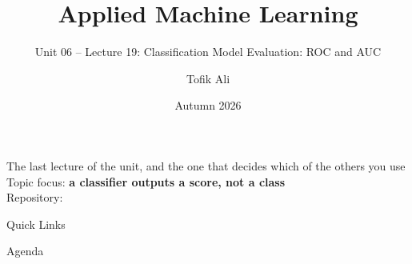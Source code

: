 \documentclass[aspectratio=169]{beamer}
\title[Applied Machine Learning]{Applied Machine Learning}
\subtitle{Unit 06 -- Lecture 19: Classification Model Evaluation:
          ROC and AUC}
\author{Tofik Ali}
\institute{School of Computer Science, UPES Dehradun}
\date{Autumn 2026}
\begin{document}
\UPESCoverFrame
\setcounter{framenumber}{0}

\begin{frame}
  \titlepage
  \begin{center}
    \footnotesize The last lecture of the unit, and the one that decides which
    of the others you use\\[0.25em]
    \footnotesize Topic focus: \textbf{a classifier outputs a score, not a
    class}\\[0.25em]
    \footnotesize Repository: \texttt{\AMLRepoURL}
  \end{center}
  \slidesources{\AMLUnitVISources}
\end{frame}

\begin{frame}{Quick Links}
  \centering
  \hyperlink{sec:whynot}{}\hspace{0.4em}
  \hyperlink{sec:cm}{}\hspace{0.4em}
  \hyperlink{sec:scores}{}\hspace{0.4em}
  \hyperlink{sec:rochand}{}\hspace{0.4em}
  \hyperlink{sec:auc}{}\hspace{0.4em}
  \hyperlink{sec:rocpr}{}\hspace{0.4em}
  \hyperlink{sec:threshold}{}\hspace{0.4em}
  \hyperlink{sec:multi}{}\hspace{0.4em}
  \hyperlink{sec:selection}{}\hspace{0.4em}
  \hyperlink{sec:summary}{}
\end{frame}

\begin{frame}{Agenda}
  \tableofcontents
\end{frame}
\end{document}

